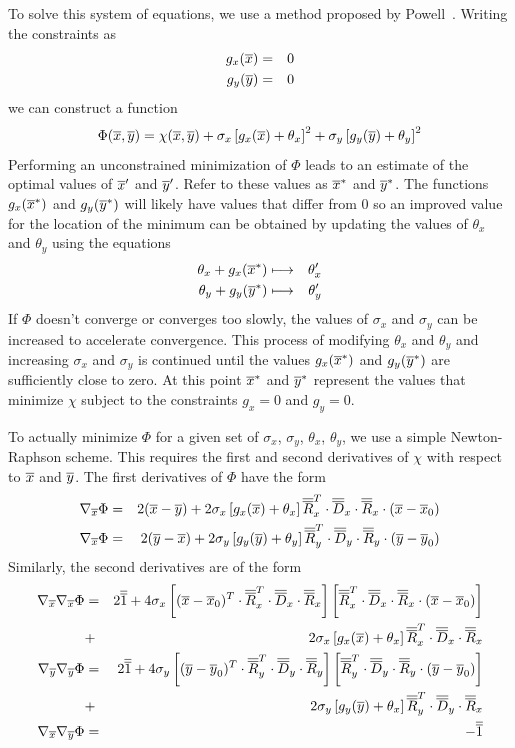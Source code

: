 \documentclass[12pt]{article}
\begin{document}
To solve this system of equations, we use a method proposed by Powell~\cite{Powell}. Writing the constraints as
\begin{eqnarray*}
g_x(\overline{x}) &=& 0\\
g_y(\overline{y}) &=& 0
\end{eqnarray*}
we can construct a function
\[
\Phi(\overline{x},\overline{y}) = \chi(\overline{x},\overline{y}) + \sigma_x\left[g_x(\overline{x})+\theta_x\right]^2
+\sigma_y\left[g_y(\overline{y})+\theta_y\right]^2
\]
Performing an unconstrained minimization of $\Phi$ leads to an estimate of the optimal values of $\overline{x}'$ and
$\overline{y}'$. Refer to these values as $\overline{x}^{\ast}$ and $\overline{y}^{\ast}$. The functions $g_x(\overline{x}^{\ast})$ and
$g_y(\overline{y}^{\ast})$ will likely have values that differ from 0 so an improved value for the location of the
minimum can be obtained by updating the values of $\theta_x$ and $\theta_y$ using the equations
\begin{eqnarray*}
\theta_x + g_x(\overline{x}^{\ast}) &\longmapsto& \theta'_x \\
\theta_y + g_y(\overline{y}^{\ast}) &\longmapsto& \theta'_y
\end{eqnarray*}
If $\Phi$ doesn't converge or converges too slowly, the values of $\sigma_x$ and $\sigma_y$ can be increased
to accelerate convergence. This process of modifying $\theta_x$ and $\theta_y$ and increasing $\sigma_x$ and
$\sigma_y$ is continued until the values $g_x(\overline{x}^{\ast})$ and $g_y(\overline{y}^{\ast})$ are sufficiently close
to zero. At this point $\overline{x}^{\ast}$ and $\overline{y}^{\ast}$ represent the values that minimize $\chi$ subject
to the constraints $g_x=0$ and $g_y=0$.

To actually minimize $\Phi$ for a given set of $\sigma_x$, $\sigma_y$, $\theta_x$, $\theta_y$, we use a
simple Newton-Raphson scheme. This requires the first and second derivatives of $\chi$ with respect to
$\overline{x}$ and $\overline{y}$. The first derivatives of $\Phi$ have the form
\begin{eqnarray*}
\nabla_{\overline{x}}\Phi &=& 2(\overline{x}-\overline{y}) + 2\sigma_x\left[g_x(\overline{x})+\theta_x\right]\overline{\overline{R}}_x^T\cdot\overline{\overline{D}}_x
\cdot\overline{\overline{R}}_x\cdot(\overline{x}-\overline{x}_0) \\
\nabla_{\overline{x}}\Phi &=& 2(\overline{y}-\overline{x}) + 2\sigma_y\left[g_y(\overline{y})+\theta_y\right]\overline{\overline{R}}_y^T\cdot\overline{\overline{D}}_y
\cdot\overline{\overline{R}}_y\cdot(\overline{y}-\overline{y}_0)
\end{eqnarray*}
Similarly, the second derivatives are of the form
\begin{eqnarray*}
\nabla_{\overline{x}}\nabla_{\overline{x}} \Phi & = & 2\overline{\overline{1}}+4\sigma_x\left[(\overline{x}-\overline{x}_0)^T\cdot\overline{\overline{R}}_x^T\cdot\overline{\overline{D}}_x
\cdot\overline{\overline{R}}_x\right]\left[\overline{\overline{R}}_x^T\cdot\overline{\overline{D}}_x\cdot\overline{\overline{R}}_x\cdot(\overline{x}-\overline{x}_0)\right] \\
& + & 2\sigma_x\left[g_x(\overline{x})+\theta_x\right]\overline{\overline{R}}_x^T\cdot\overline{\overline{D}}_x\cdot\overline{\overline{R}}_x \\
\nabla_{\overline{y}}\nabla_{\overline{y}} \Phi & = & 2\overline{\overline{1}}+4\sigma_y\left[(\overline{y}-\overline{y}_0)^T\cdot\overline{\overline{R}}_y^T\cdot\overline{\overline{D}}_y
\cdot\overline{\overline{R}}_y\right]\left[\overline{\overline{R}}_y^T\cdot\overline{\overline{D}}_y\cdot\overline{\overline{R}}_y\cdot(\overline{y}-\overline{y}_0)\right] \\
& + & 2\sigma_y\left[g_y(\overline{y})+\theta_x\right]\overline{\overline{R}}_y^T\cdot\overline{\overline{D}}_y\cdot\overline{\overline{R}}_x \\
\nabla_{\overline{x}}\nabla_{\overline{y}} \Phi & = & -\overline{\overline{1}}
\end{eqnarray*}
\end{document}
